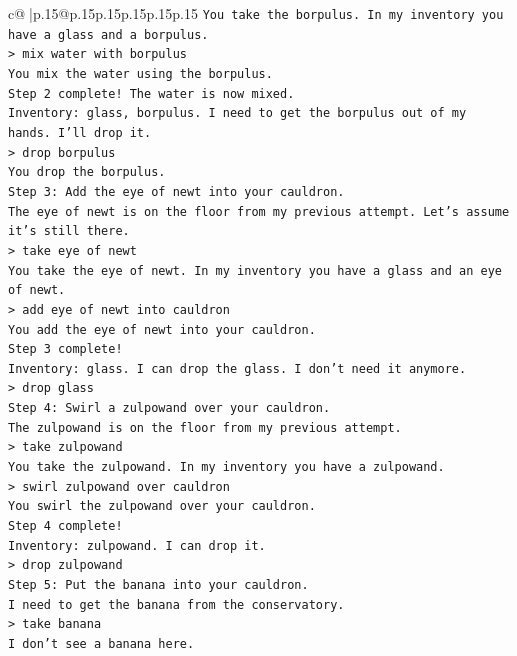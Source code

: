 \documentclass{article}
\begin{document}
{\begin{supertabular}{c@{$\;$}|p{.15\linewidth}@{}p{.15\linewidth}p{.15\linewidth}p{.15\linewidth}p{.15\linewidth}p{.15\linewidth}}
{{{\texttt{You take the borpulus. In my inventory you have a glass and a borpulus.} \\
\texttt{> mix water with borpulus} \\
\texttt{You mix the water using the borpulus.} \\
\texttt{Step 2 complete! The water is now mixed.} \\
\texttt{Inventory: glass, borpulus. I need to get the borpulus out of my hands. I'll drop it.} \\
\texttt{> drop borpulus} \\
\texttt{You drop the borpulus.} \\
\texttt{Step 3: Add the eye of newt into your cauldron.} \\
\texttt{The eye of newt is on the floor from my previous attempt. Let's assume it's still there.} \\
\texttt{> take eye of newt} \\
\texttt{You take the eye of newt. In my inventory you have a glass and an eye of newt.} \\
\texttt{> add eye of newt into cauldron} \\
\texttt{You add the eye of newt into your cauldron.} \\
\texttt{Step 3 complete!} \\
\texttt{Inventory: glass. I can drop the glass. I don't need it anymore.} \\
\texttt{> drop glass} \\
\texttt{Step 4: Swirl a zulpowand over your cauldron.} \\
\texttt{The zulpowand is on the floor from my previous attempt.} \\
\texttt{> take zulpowand} \\
\texttt{You take the zulpowand. In my inventory you have a zulpowand.} \\
\texttt{> swirl zulpowand over cauldron} \\
\texttt{You swirl the zulpowand over your cauldron.} \\
\texttt{Step 4 complete!} \\
\texttt{Inventory: zulpowand. I can drop it.} \\
\texttt{> drop zulpowand} \\
\texttt{Step 5: Put the banana into your cauldron.} \\
\texttt{I need to get the banana from the conservatory.} \\
\texttt{> take banana} \\
\texttt{I don't see a banana here.} \\
}}}
\end{supertabular}}
\end{document}
